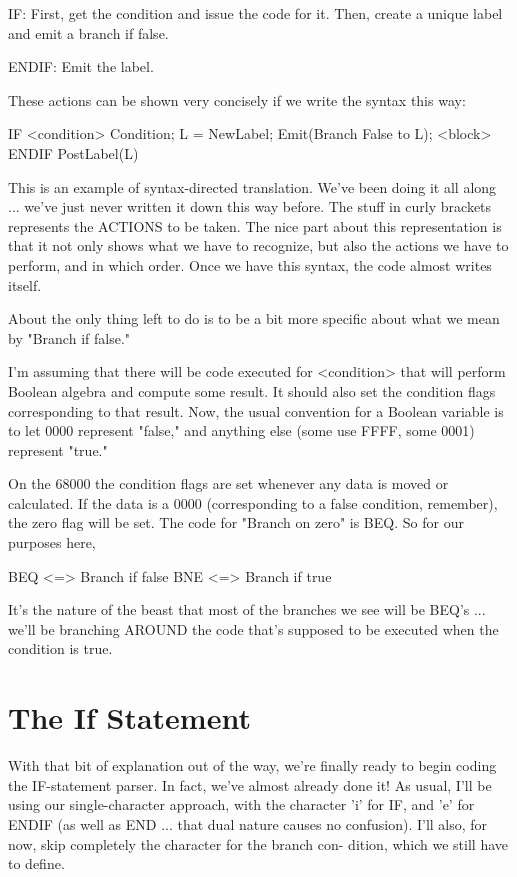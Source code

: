 \documentclass[float=false, crop=false]{standalone}
\begin{document}
     IF:  First, get the condition and issue the code for it.
          Then, create a unique label and emit a branch if false.

     ENDIF: Emit the label.


These actions can be shown very concisely if we write the syntax this way:


     IF
     <condition>    { Condition;
                      L = NewLabel;
                      Emit(Branch False to L); }
     <block>
     ENDIF          { PostLabel(L) }


This is an example of syntax-directed translation. We've been doing it all along
... we've just never written it down this way before. The stuff in curly
brackets represents the ACTIONS to be taken. The nice part about this
representation is that it not only shows what we have to recognize, but also the
actions we have to perform, and in which order. Once we have this syntax, the
code almost writes itself.

About the only thing left to do is to be a bit more specific about what we mean
by "Branch if false."

I'm assuming that there will be code executed for <condition> that will perform
Boolean algebra and compute some result. It should also set the condition flags
corresponding to that result. Now, the usual convention for a Boolean variable
is to let 0000 represent "false," and anything else (some use FFFF, some 0001)
represent "true."

On the 68000 the condition flags are set whenever any data is moved or
calculated. If the data is a 0000 (corresponding to a false condition,
remember), the zero flag will be set. The code for "Branch on zero" is BEQ. So
for our purposes here,


               BEQ  <=> Branch if false
               BNE  <=> Branch if true


It's the nature of the beast that most of the branches we see will be BEQ's ...
we'll be branching AROUND the code that's supposed to be executed when the
condition is true.


\section{The If Statement}

With that bit of explanation out of the way, we're finally ready to begin coding
the IF-statement parser. In fact, we've almost already done it! As usual, I'll
be using our single-character approach, with the character 'i' for IF, and 'e'
for ENDIF (as well as END ... that dual nature causes no confusion). I'll also,
for now, skip completely the character for the branch con- dition, which we
still have to define.
\end{document}
